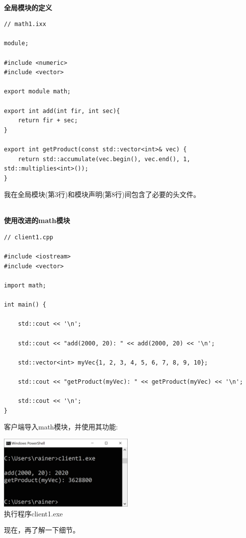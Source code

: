 \hspace*{\fill} \\ %
\noindent
\textbf{全局模块的定义}
\begin{lstlisting}[style=styleCXX]
// math1.ixx

module;

#include <numeric>
#include <vector>

export module math;

export int add(int fir, int sec){
	return fir + sec;
}

export int getProduct(const std::vector<int>& vec) {
	return std::accumulate(vec.begin(), vec.end(), 1, std::multiplies<int>());
}
\end{lstlisting}

我在全局模块(第3行)和模块声明(第8行)间包含了必要的头文件。

\hspace*{\fill} \\ %
\noindent
\textbf{使用改进的math模块}
\begin{lstlisting}[style=styleCXX]
// client1.cpp

#include <iostream>
#include <vector>

import math;

int main() {
	
	std::cout << '\n';
	
	std::cout << "add(2000, 20): " << add(2000, 20) << '\n';
	
	std::vector<int> myVec{1, 2, 3, 4, 5, 6, 7, 8, 9, 10};
	
	std::cout << "getProduct(myVec): " << getProduct(myVec) << '\n';
	
	std::cout << '\n';
}
\end{lstlisting}

客户端导入math模块，并使用其功能:

\begin{center}
\includegraphics[width=0.5\textwidth]{content/3/chapter4/images/17.png}\\
执行程序client1.exe
\end{center}

现在，再了解一下细节。


